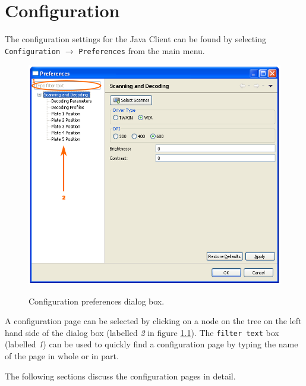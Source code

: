 \chapter{Configuration}
\label{chap:configuration}
The configuration settings for the Java Client can be found by selecting
\texttt{Configuration} $\to$ \texttt{Preferences} from the main menu.
    \begin{figure}[H]
      \centering
      \scalebox{0.5}
      { \includegraphics*{screenshots/configuration/preferences_dialog} }
      \caption{Configuration preferences dialog box.}
      \label{fig:preferences_dialog}
    \end{figure}
A configuration page can be selected by clicking on a node on the tree on the
left hand side of the dialog box (labelled \emph{2} in figure
\ref{fig:preferences_dialog}). The \texttt{filter text} box (labelled \emph{1})
can be used to quickly find a configuration page by typing the name of the page
in whole or in part.

The following sections discuss the configuration pages in detail.

